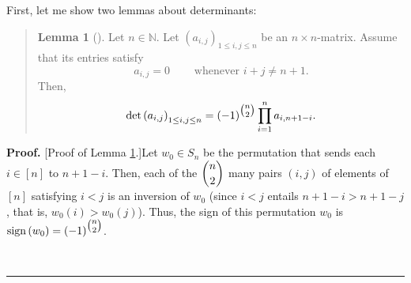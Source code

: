 \documentclass[numbers=enddot,12pt,final,onecolumn,notitlepage]{scrartcl}%
\newenvironment{statement}{\begin{quote}}{\end{quote}}
\theoremstyle{definition}
\newtheorem{lem}[theo]{Lemma}
\newenvironment{lemmain}[1][]
{\begin{statement}\begin{lem}[#1]}
{\end{lem}\end{statement}}
\newenvironment{proof}[1][Proof]{\noindent\textbf{#1.} }{\ \rule{0.5em}{0.5em}}
\newenvironment{lemmain}[1][Proof]{\noindent\textbf{#1.} }{\ \rule{0.5em}{0.5em}}
\let\prodnonlimits\prod
\renewcommand{\prod}{\prodnonlimits\limits}
\begin{document}
\begin{enumerate}
First, let me show two lemmas about determinants:

\begin{lemmain}
\label{lem.p37.det1}Let $n\in\mathbb{N}$. Let $\left(  a_{i,j}\right)  _{1\leq
i,j\leq n}$ be an $n\times n$-matrix. Assume that its entries satisfy%
\begin{equation}
a_{i,j}=0\ \ \ \ \ \ \ \ \ \ \text{whenever }i+j\neq n+1.
\label{eq.lem.p37.det1.ass}%
\end{equation}
Then,%
\[
\det\left(  a_{i,j}\right)  _{1\leq i,j\leq n}=\left(  -1\right)  ^{\tbinom
{n}{2}}\prod_{i=1}^{n}a_{i,n+1-i}.
\]

\end{lemmain}

\begin{proof}
[Proof of Lemma \ref{lem.p37.det1}.]Let $w_{0}\in S_{n}$ be the permutation
that sends each $i\in\left[  n\right]  $ to $n+1-i$. Then, each of the
$\dbinom{n}{2}$ many pairs $\left(  i,j\right)  $ of elements of $\left[
n\right]  $ satisfying $i<j$ is an inversion of $w_{0}$ (since $i<j$ entails
$n+1-i>n+1-j$, that is, $w_{0}\left(  i\right)  >w_{0}\left(  j\right)  $).
Thus, the sign of this permutation $w_{0}$ is $\operatorname*{sign}\left(
w_{0}\right)  =\left(  -1\right)  ^{\tbinom{n}{2}}$.


\end{proof}
\end{enumerate}
\end{document}
